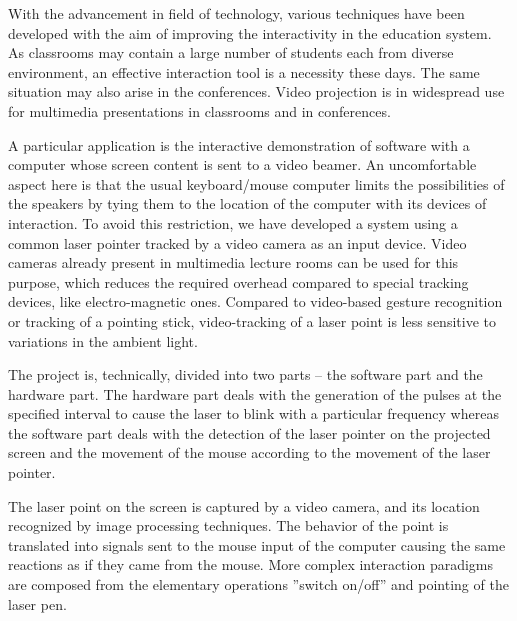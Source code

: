 \thispagestyle{plain}
\begin{center}
	\large
	\vspace{0.5cm}	
\end{center}

        With the advancement in field of technology, various techniques have been developed with the aim of improving the interactivity in the education system. As classrooms may contain a large number of students each from diverse environment, an effective interaction tool is a necessity these days. The same situation may also arise in the conferences. Video projection is in widespread use for multimedia presentations in classrooms and in conferences. 

A particular application is the interactive demonstration of software with a computer whose screen content is sent to a video beamer. An uncomfortable aspect here is that the usual keyboard/mouse computer limits the possibilities of the speakers by tying them to the location of the computer with its devices of interaction. To avoid this restriction, we have developed a system using a common laser pointer tracked by a video camera as an input device. Video cameras already present in multimedia lecture rooms can be used for this purpose, which reduces the required overhead compared to special tracking devices, like electro-magnetic ones. Compared to video-based gesture recognition or tracking of a pointing stick, video-tracking of a laser point is less sensitive to variations in the ambient
light.

The project is, technically, divided into two parts – the software part and the hardware part. The hardware part deals with the generation of the pulses at the specified interval to cause the laser to blink with a particular frequency whereas the software part deals with the detection of the laser pointer on the projected screen and the movement of the mouse according to the movement of the laser pointer.

The laser point on the screen is captured by a video camera, and its location recognized by image processing techniques. The behavior of the point is translated into signals sent to the mouse input of the computer causing the same reactions as if they came from the mouse. More complex interaction paradigms are composed from the elementary operations ”switch on/off” and pointing of the laser pen.

